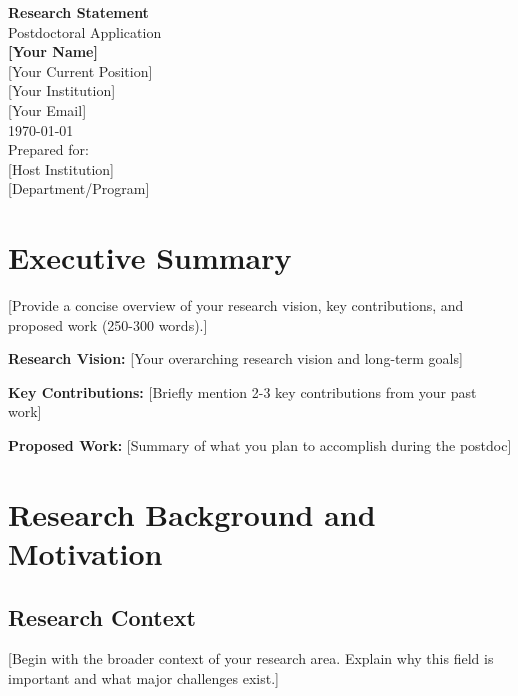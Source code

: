\documentclass[11pt,a4paper]{article}
\begin{document}
\begin{titlepage}
    \centering
    \vspace*{2cm}
    {\Huge\bfseries Research Statement}\\[1cm]
    {\Large Postdoctoral Application}\\[2cm]
    
    {\Large\bfseries [Your Name]}\\[0.5cm]
    {\large [Your Current Position]}\\[0.3cm]
    {\large [Your Institution]}\\[0.3cm]
    {\large [Your Email]}\\[2cm]
    
    {\large \today}\\[2cm]
    
    \vfill
    {\large Prepared for:}\\[0.3cm]
    {\large [Host Institution]}\\[0.3cm]
    {\large [Department/Program]}
\end{titlepage}

\tableofcontents
\newpage

\section{Executive Summary}
[Provide a concise overview of your research vision, key contributions, and proposed work (250-300 words).]

\vspace{0.5cm}
\textbf{Research Vision:} [Your overarching research vision and long-term goals]

\textbf{Key Contributions:} [Briefly mention 2-3 key contributions from your past work]

\textbf{Proposed Work:} [Summary of what you plan to accomplish during the postdoc]

\newpage

\section{Research Background and Motivation}
\subsection{Research Context}
[Begin with the broader context of your research area. Explain why this field is important and what major challenges exist.]
\end{document}
